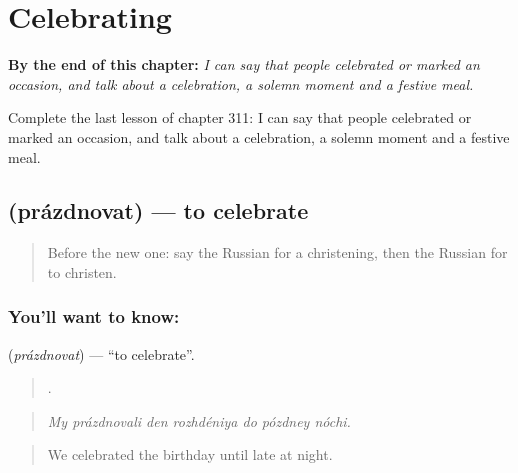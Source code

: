 
\chapter{Celebrating}
\label{ch:ru-celebrating}

\begin{chapteropening}
\textbf{By the end of this chapter:} \emph{I can say that people celebrated or marked an occasion, and talk about a celebration, a solemn moment and a festive meal.}

Complete the last lesson of chapter 311: I can say that people celebrated or marked an occasion, and talk about a celebration, a solemn moment and a festive meal.
\end{chapteropening}

\section[\texorpdfstring{\ru{праздновать} (prázdnovat)}{праздновать (prázdnovat)}]{ (prázdnovat) — to celebrate}

\label{lesson:RU-C311-prazdnovat}



\begin{quote}
Before the new one: say the Russian for a christening, then the Russian for to christen.
\end{quote}

\subsection*{You'll want to know: }
\textbf{} (\emph{prázdnovat}) — \textquotedblleft{}to celebrate\textquotedblright{}.

\begin{quote}
      .
\end{quote}

\begin{quote}
\emph{My prázdnovali den rozhdéniya do pózdney nóchi.}
\end{quote}

\begin{quote}
We celebrated the birthday until late at night.
\end{quote}

